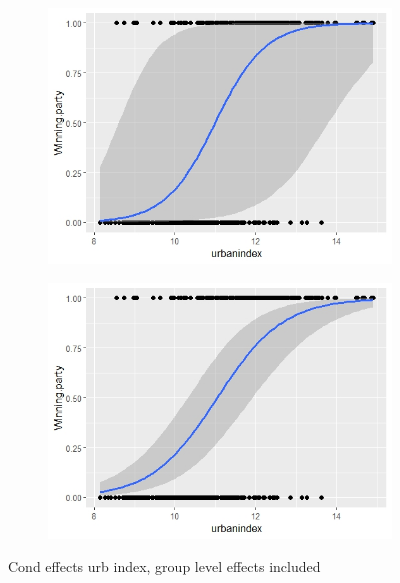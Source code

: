 \documentclass[12pt]{article}
\begin{document}
\begin{figure}[h] 
	\centering
	\begin{subfigure}{0.45\textwidth}
		\centering
		\includegraphics[width=\linewidth]{results/cond_eff_urb_model1_groupeff.jpeg}
		\label{fig:subfig1}
	\end{subfigure}
	\hfill
	\begin{subfigure}{0.45\textwidth}
		\centering
		\includegraphics[width=\linewidth]{results/cond_eff_urb_model2_groupeff.jpeg}
		\label{fig:subfig2}
	\end{subfigure}
	\caption{Cond effects urb index, group level effects included}
	\label{fig:cond_effects}
\end{figure}
\end{document}
